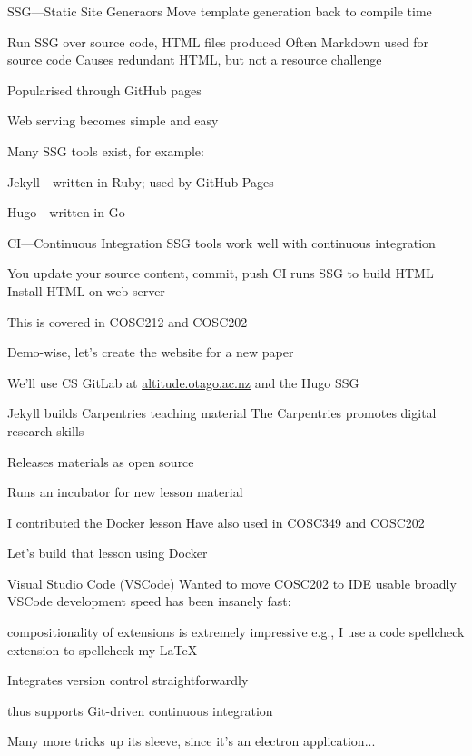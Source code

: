 \documentclass[aspectratio=169,t]{beamer}
\begin{document}
\begin{dframe}{SSG---Static Site Generaors}
  \1 Move template generation back to compile time

  \2 Run SSG over source code, HTML files produced
  \2 Often Markdown used for source code
  \2 Causes redundant HTML, but not a resource challenge

  \1 Popularised through GitHub pages

  \2 Web serving becomes simple and easy


  \1 Many SSG tools exist, for example:

  \2 Jekyll---written in Ruby; used by GitHub Pages

  \2 Hugo---written in Go
\end{dframe}

\begin{dframe}{CI---Continuous Integration}
  \1 SSG tools work well with continuous integration

  \2 You update your source content, commit, push
  \2 CI runs SSG to build HTML
  \2 Install HTML on web server

  \bigskip
  
  \1 This is covered in COSC212 and COSC202
  
  \bigskip

  \1 Demo-wise, let's create the website for a new paper
  
  \2 We'll use CS GitLab at \url{altitude.otago.ac.nz} and the Hugo SSG
\end{dframe}

\begin{dframe}{Jekyll builds Carpentries teaching material}
  \1 The Carpentries promotes digital research skills

  \2 Releases materials as open source

  \bigskip
  
  \1 Runs an incubator for new lesson material
  
  \2 I contributed the Docker lesson
  \2 Have also used in COSC349 and COSC202
  
  \bigskip

  \1 Let's build that lesson using Docker
\end{dframe}

\begin{dframe}{Visual Studio Code (VSCode)}
  \1 Wanted to move COSC202 to IDE usable broadly
  \1 VSCode development speed has been insanely fast:
  
  \2 compositionality of extensions is extremely impressive
  \2 e.g., I use a code spellcheck extension to spellcheck my \LaTeX{}

  \1 Integrates version control straightforwardly
  
  \2 thus supports Git-driven continuous integration
  
  \1 Many more tricks up its sleeve, since it's an electron application...
\end{dframe}
\end{document}
